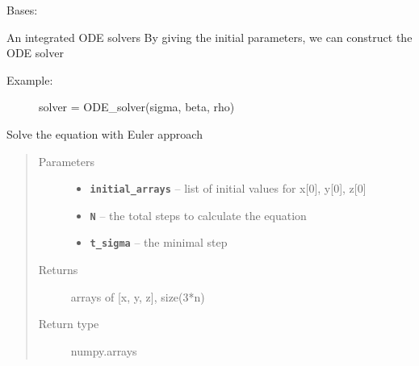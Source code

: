 \documentclass[letterpaper,10pt,english]{sphinxmanual}
\begin{document}

\begin{fulllineitems}
\label{_autosummary/lorenz:lorenz.solver.ODE_solvers}
Bases: \href{https://docs.python.org/library/functions.html\#object}{}

An integrated ODE solvers
By giving the initial parameters, we can construct the ODE solver
\begin{description}
\item[{Example:}] \leavevmode
solver = ODE\_solver(sigma, beta, rho)

\end{description}

\begin{fulllineitems}
\label{_autosummary/lorenz:lorenz.solver.ODE_solvers.Euler_solve}
Solve the equation with Euler approach
\begin{quote}\begin{description}
\item[{Parameters}] \leavevmode\begin{itemize}
\item {} 
\textbf{\texttt{initial\_arrays}} -- list of initial values for x{[}0{]}, y{[}0{]}, z{[}0{]}

\item {} 
\textbf{\texttt{N}} -- the total steps to calculate the equation

\item {} 
\textbf{\texttt{t\_sigma}} -- the minimal step

\end{itemize}

\item[{Returns}] \leavevmode
arrays of {[}x, y, z{]}, size(3*n)

\item[{Return type}] \leavevmode
numpy.arrays

\end{description}\end{quote}

\end{fulllineitems}


\end{fulllineitems}
\end{document}
